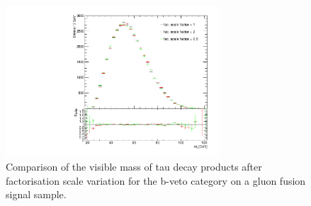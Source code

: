  

\begin{figure}[tdp]
\begin{center}
\includegraphics[width=8cm]{figure/facs_mll_bveto}
\end{center}
\caption{ Comparison of the visible mass of tau decay products after factorisation scale variation for the b-veto category on a gluon fusion signal sample.}
\label{fig:theory_mass}
\end{figure}



